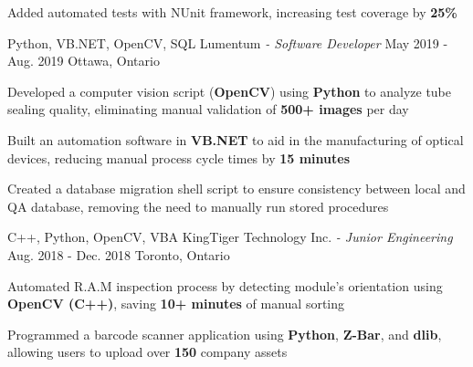 \begin{siderules}
\begin{cventries}
{\begin{cvitems}
        \item {Added automated tests with NUnit framework, increasing test coverage by \textbf{25\%}}
      \end{cvitems}
    }
    \cventry
      {Python, VB.NET, OpenCV, SQL}
      {Lumentum\hspace{0.15em} \bodyfontlight\itshape{- Software Developer}}
      {May 2019 - Aug. 2019}
      {Ottawa, Ontario}
      {
        \begin{cvitems}
          \item {Developed a computer vision script (\textbf{OpenCV}) using \textbf{Python} to analyze tube sealing quality, eliminating manual validation of \textbf{500+ images} per day}
          \item {Built an automation software in \textbf{VB.NET} to aid in the manufacturing of optical devices, reducing manual process cycle times by \textbf{15 minutes}}
          \item {Created a database migration shell script to ensure consistency between local and QA database, removing the need to manually run stored procedures}
        \end{cvitems}
      }
    \cventry
      {C++, Python, OpenCV, VBA}
      {KingTiger Technology Inc.\hspace{0.15em} \bodyfontlight\itshape{- Junior Engineering}}
      {Aug. 2018 - Dec. 2018}
      {Toronto, Ontario}
      {
        \begin{cvitems}
          \item {Automated R.A.M inspection process by detecting module's orientation using \textbf{OpenCV (C++)}, saving \textbf{10+ minutes} of manual sorting}
          \item {Programmed a barcode scanner application using \textbf{Python}, \textbf{Z-Bar}, and \textbf{dlib}, allowing users to upload over \textbf{150} company assets }
        \end{cvitems}
      }
  \end{cventries}
\end{siderules}